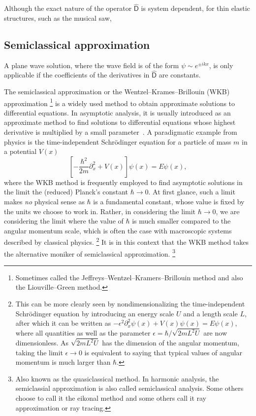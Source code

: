 Although the exact nature of the operator $\hat{\mathsf{D}}$ is system dependent, for thin elastic structures, such as the musical saw, 

\subsection{Semiclassical approximation}

A plane wave solution, where the wave field is of the form $\psi \sim e^{\pm i kx}$, is only applicable if the coefficients of the derivatives in $\widehat{\mathsf{D}}$ are constants.

The semiclassical approximation or the Wentzel--Krames--Brillouin (WKB) approximation%
\footnote{Sometimes called the Jeffreys--Wentzel--Kramers--Brillouin method and also the Liouville--Green method.}
is a widely used method to obtain approximate solutions to differential equations.
In asymptotic analysis, it is usually introduced as an approximate method to find solutions to differential equations whose highest derivative is multiplied by a small parameter~\cite{bender1978}.
A paradigmatic example from physics is the time-independent Schr\"{o}dinger equation for a particle of mass $m$ in a potential $V(x)$
%
\begin{equation}
  \left[-\frac{\hbar^{2}}{2m}\partial_{x}^{2} + V(x)\right]\psi(x) = E\psi(x),
\end{equation}
%
where the WKB method is frequently employed to find asymptotic solutions in the limit the (reduced) Planck's constant $\hbar \to 0$.
At first glance, such a limit makes \emph{no} physical sense as $\hbar$ is a fundamental constant, whose value is fixed by the units we choose to work in.
Rather, in considering the limit $\hbar \to 0$, we are considering the limit where the value of $\hbar$ is much smaller compared to the angular momentum scale, which is often the case with macroscopic systems described by classical physics.%
\footnote{%
  This can be more clearly seen by nondimensionalizing the time-independent Schr\"{o}dinger equation by introducing an energy scale $U$ and a length scale $L$, after which it can be written as
$-\epsilon^{2}\partial_{{x}}^{2}\psi(x) + {V}(x)\psi(x) = {E}\psi(x)$,
where all quantities as well as the parameter $\epsilon = \hbar/\sqrt{2mL^{2}U}$ are now dimensionless.
As $\sqrt{2mL^{2}U}$ has the dimension of the angular momentum, taking the limit $\epsilon \to 0$ is equivalent to saying that typical values of angular momentum is much larger than $\hbar$.}
It is in this context that the WKB method takes the alternative moniker of semiclassical approximation.%
\footnote{Also known as the quasiclassical method.  In harmonic analysis, the semiclassial approximation is also called semiclassical analysis.  Some others choose to call it the eikonal method and some others call it ray approximation or ray tracing.}

